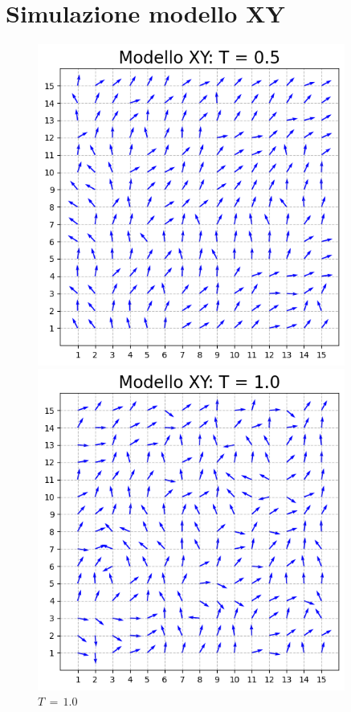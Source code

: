 \section{Simulazione modello XY}

\vspace*{\fill}

\begin{figure}[H]
    \centering
    \begin{minipage}{0.45\textwidth}  
      \centering
      \includegraphics[page=1, width=0.9\textwidth]{Immagini/simModelloXY/conf_t0.5.png}
      \caption{$T\,=\,0.5$}
    \end{minipage}\hfill
    \begin{minipage}{0.45\textwidth}  
      \centering
      \includegraphics[page=1, width=0.9\textwidth]{Immagini/simModelloXY/conf_t1.0.png}
      \caption{$T\,=\,1.0$}
    \end{minipage}
    \vspace{12pt}


\end{figure}
